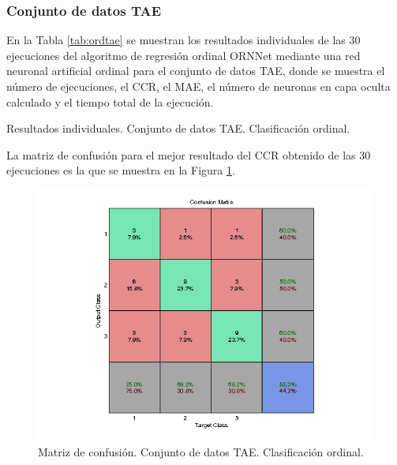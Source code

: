 			\subsubsection{Conjunto de datos TAE}
			
			En la Tabla \ref{tab:ordtae} se muestran los resultados individuales de las 30 ejecuciones del algoritmo de regresión ordinal ORNNet mediante una red neuronal artificial ordinal para el conjunto de datos TAE, donde se muestra el número de ejecuciones, el CCR, el MAE, el número de neuronas en capa oculta calculado y el tiempo total de la ejecución.\\
			
			\begin{table}[!htbp]
				\centering
				\caption{Resultados individuales. Conjunto de datos TAE. Clasificación ordinal.}
				\label{tab:ordtae}
			\end{table}
			
			La matriz de confusión para el mejor resultado del CCR obtenido de las 30 ejecuciones es la que se muestra en la Figura \ref{fig:ordtae}.
			
			\begin{figure}[htbp]
				\centering
				\includegraphics[scale=0.8]{../src/results/ordinal/tae_mc1.png}
				\caption{Matriz de confusión. Conjunto de datos TAE. Clasificación ordinal.}
				\label{fig:ordtae}
			\end{figure}
			
